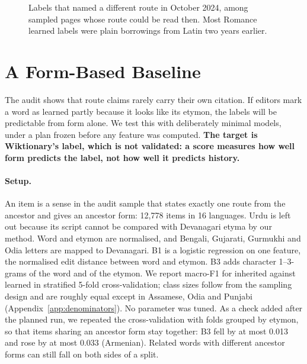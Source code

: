 \documentclass[11pt]{article}
\begin{document}
\begin{figure}[t]
\centering
{}
\caption{Labels that named a different route in October 2024, among sampled pages whose route could be read then. Most Romance learned labels were plain borrowings from Latin two years earlier.}
\label{fig:history}
\end{figure}

\section{A Form-Based Baseline}
\label{sec:baseline}

The audit shows that route claims rarely carry their own citation. If editors mark a word as learned partly because it looks like its etymon, the labels will be predictable from form alone. We test this with deliberately minimal models, under a plan frozen before any feature was computed. \textbf{The target is Wiktionary's label, which is not validated: a score measures how well form predicts the label, not how well it predicts history.}

\paragraph{Setup.} An item is a sense in the audit sample that states exactly one route from the ancestor and gives an ancestor form: 12,778 items in 16 languages. Urdu is left out because its script cannot be compared with Devanagari etyma by our method. Word and etymon are normalised, and Bengali, Gujarati, Gurmukhi and Odia letters are mapped to Devanagari. B1 is a logistic regression on one feature, the normalised edit distance between word and etymon. B3 adds character 1--3-grams of the word and of the etymon. We report macro-F1 for inherited against learned in stratified 5-fold cross-validation; class sizes follow from the sampling design and are roughly equal except in Assamese, Odia and Punjabi (Appendix~\ref{app:denominators}). No parameter was tuned. As a check added after the planned run, we repeated the cross-validation with folds grouped by etymon, so that items sharing an ancestor form stay together: B3 fell by at most 0.013 and rose by at most 0.033 (Armenian). Related words with different ancestor forms can still fall on both sides of a split.
\end{document}
